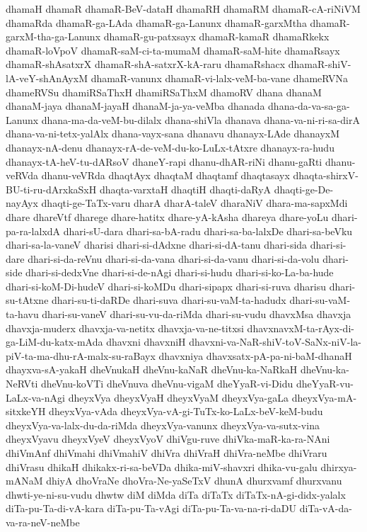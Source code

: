 {dhamaH
dhamaR
dhamaR-BeV-dataH
dhamaRH
dhamaRM
dhamaR-cA-riNiVM
dhamaRda
dhamaR-ga-LAda
dhamaR-ga-Lanunx
dhamaR-garxMtha
dhamaR-garxM-tha-ga-Lanunx
dhamaR-gu-patxsayx
dhamaR-kamaR
dhamaRkekx
dhamaR-loVpoV
dhamaR-saM-ci-ta-mumaM
dhamaR-saM-hite
dhamaRsayx
dhamaR-shAsatxrX
dhamaR-shA-satxrX-kA-raru
dhamaRshacx
dhamaR-shiV-lA-veY-shAnAyxM
dhamaR-vanunx
dhamaR-vi-lalx-veM-ba-vane
dhameRVNa
dhameRVSu
dhamiRSaThxH
dhamiRSaThxM
dhamoRV
dhana
dhanaM
dhanaM-jaya
dhanaM-jayaH
dhanaM-ja-ya-veMba
dhanada
dhana-da-va-sa-ga-Lanunx
dhana-ma-da-veM-bu-dilalx
dhana-shiVla
dhanava
dhana-va-ni-ri-sa-dirA
dhana-va-ni-tetx-yalAlx
dhana-vayx-sana
dhanavu
dhanayx-LAde
dhanayxM
dhanayx-nA-denu
dhanayx-rA-de-veM-du-ko-LuLx-tAtxre
dhanayx-ra-hudu
dhanayx-tA-heV-tu-dARsoV
dhaneY-rapi
dhanu-dhAR-riNi
dhanu-gaRti
dhanu-veRVda
dhanu-veVRda
dhaqtAyx
dhaqtaM
dhaqtamf
dhaqtasayx
dhaqta-shirxV-BU-ti-ru-dArxkaSxH
dhaqta-varxtaH
dhaqtiH
dhaqti-daRyA
dhaqti-ge-De-nayAyx
dhaqti-ge-TaTx-varu
dharA
dharA-taleV
dharaNiV
dhara-ma-sapxMdi
dhare
dhareVtf
dharege
dhare-hatitx
dhare-yA-kAsha
dhareya
dhare-yoLu
dhari-pa-ra-lalxdA
dhari-sU-dara
dhari-sa-bA-radu
dhari-sa-ba-lalxDe
dhari-sa-beVku
dhari-sa-la-vaneV
dharisi
dhari-si-dAdxne
dhari-si-dA-tanu
dhari-sida
dhari-si-dare
dhari-si-da-reVnu
dhari-si-da-vana
dhari-si-da-vanu
dhari-si-da-volu
dhari-side
dhari-si-dedxVne
dhari-si-de-nAgi
dhari-si-hudu
dhari-si-ko-La-ba-hude
dhari-si-koM-Di-hudeV
dhari-si-koMDu
dhari-sipapx
dhari-si-ruva
dharisu
dhari-su-tAtxne
dhari-su-ti-daRDe
dhari-suva
dhari-su-vaM-ta-hadudx
dhari-su-vaM-ta-havu
dhari-su-vaneV
dhari-su-vu-da-riMda
dhari-su-vudu
dhavxMsa
dhavxja
dhavxja-muderx
dhavxja-va-netitx
dhavxja-va-ne-titxsi
dhavxnavxM-ta-rAyx-di-ga-LiM-du-katx-mAda
dhavxni
dhavxniH
dhavxni-va-NaR-shiV-toV-SaNx-niV-la-piV-ta-ma-dhu-rA-malx-su-raBayx
dhavxniya
dhavxsatx-pA-pa-ni-baM-dhanaH
dhayxva-sA-yakaH
dheVnukaH
dheVnu-kaNaR
dheVnu-ka-NaRkaH
dheVnu-ka-NeRVti
dheVnu-koVTi
dheVnuva
dheVnu-vigaM
dheYyaR-vi-Didu
dheYyaR-vu-LaLx-va-nAgi
dheyxVya
dheyxVyaH
dheyxVyaM
dheyxVya-gaLa
dheyxVya-mA-sitxkeYH
dheyxVya-vAda
dheyxVya-vA-gi-TuTx-ko-LaLx-beV-keM-budu
dheyxVya-va-lalx-du-da-riMda
dheyxVya-vanunx
dheyxVya-va-sutx-vina
dheyxVyavu
dheyxVyeV
dheyxVyoV
dhiVgu-ruve
dhiVka-maR-ka-ra-NAni
dhiVmAnf
dhiVmahi
dhiVmahiV
dhiVra
dhiVraH
dhiVra-neMbe
dhiVraru
dhiVrasu
dhikaH
dhikakx-ri-sa-beVDa
dhika-miV-shavxri
dhika-vu-galu
dhirxya-mANaM
dhiyA
dhoVraNe
dhoVra-Ne-yaSeTxV
dhunA
dhurxvamf
dhurxvanu
dhwti-ye-ni-su-vudu
dhwtw
diM
diMda
diTa
diTaTx
diTaTx-nA-gi-didx-yalalx
diTa-pu-Ta-di-vA-kara
diTa-pu-Ta-vAgi
diTa-pu-Ta-va-na-ri-daDU
diTa-vA-da-va-ra-neV-neMbe
}
